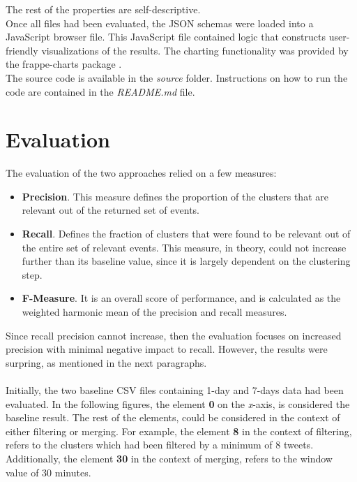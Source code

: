 \documentclass[a4paper,portrait,12pt]{article}
\begin{document}
The rest of the properties are self-descriptive.\\

Once all files had been evaluated, the JSON schemas were loaded into a JavaScript browser file.
This JavaScript file contained logic that constructs user-friendly visualizations of the results.
The charting functionality was provided by the frappe-charts package \cite{frappeCharts}.\\

The source code is available in the \textit{source} folder.
Instructions on how to run the code are contained in the \textit{README.md} file.

\section{Evaluation}
\label{section-eval}

The evaluation of the two approaches relied on a few measures:
\begin{itemize}
	\item \textbf{Precision}.
	      This measure defines the proportion of the clusters that are relevant out of the returned set of events.
	\item \textbf{Recall}.
	      Defines the fraction of clusters that were found to be relevant out of the entire set of relevant events.
	      This measure, in theory, could not increase further than its baseline value, since it is largely dependent on the clustering step.
	\item \textbf{F-Measure}.
	      It is an overall score of performance, and is calculated as the weighted harmonic mean of the precision and recall measures.
\end{itemize}

Since recall precision cannot increase, then the evaluation focuses on increased precision with minimal negative impact to recall.
However, the results were surpring, as mentioned in the next paragraphs.\\
\\
Initially, the two baseline CSV files containing 1-day and 7-days data had been evaluated.
In the following figures, the element \textbf{0} on the \textit{x}-axis, is considered the baseline result.
The rest of the elements, could be considered in the context of either filtering or merging.
For example, the element \textbf{8} in the context of filtering, refers to the clusters which had been filtered by a minimum of 8 tweets.
Additionally, the element \textbf{30} in the context of merging, refers to the window value of 30 minutes.
\end{document}
